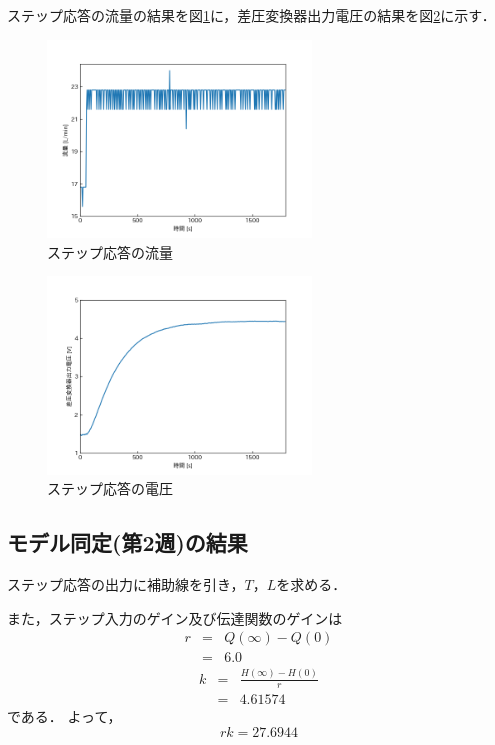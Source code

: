 \documentclass[12pt]{jsarticle}
\begin{document}
ステップ応答の流量の結果を図\ref{Result-StepResponse-Q}に，差圧変換器出力電圧の結果を図\ref{Result-StepResponse-V}に示す．
\begin{figure}[tb]
  \begin{center}
    \includegraphics[clip,width=7.0cm]{../graph/StepResponseQ.png}
    \caption{ステップ応答の流量}
    \label{Result-StepResponse-Q}
  \end{center}
\end{figure}
\begin{figure}[tb]
  \begin{center}
    \includegraphics[clip,width=7.0cm]{../graph/StepResponseV.png}
    \caption{ステップ応答の電圧}
    \label{Result-StepResponse-V}
  \end{center}
\end{figure}

\subsection{モデル同定(第2週)の結果}
ステップ応答の出力に補助線を引き，$T$，$L$を求める．

また，ステップ入力のゲイン及び伝達関数のゲインは
\begin{eqnarray}
  \label{}
  r &=& Q(\infty) - Q(0) \\
  &=& 6.0
\end{eqnarray}
\begin{eqnarray}
  \label{}
  k &=& \frac{H(\infty) - H(0)}{r} \\
  &=& 4.61574 \nonumber
\end{eqnarray}
である．
よって，
\begin{equation}
  \label{}
  rk = 27.6944
\end{equation}
\end{document}
